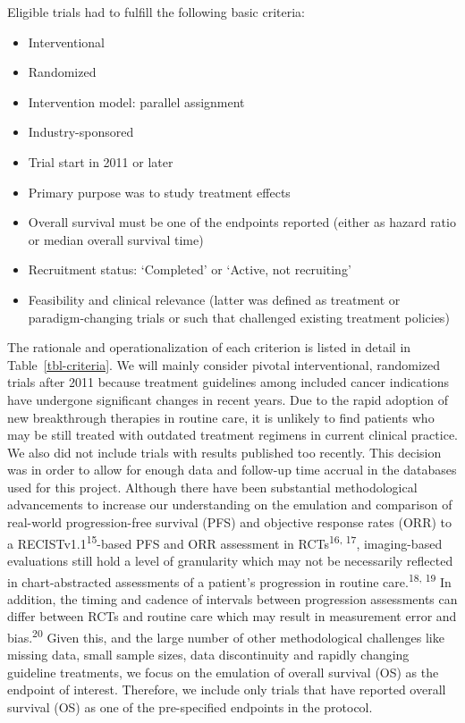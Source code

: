 \documentclass[
  letterpaper,
  DIV=11,
  numbers=noendperiod]{scrartcl}
\begin{document}
Eligible trials had to fulfill the following basic criteria:

\begin{itemize}
\item
  Interventional
\item
  Randomized
\item
  Intervention model: parallel assignment
\item
  Industry-sponsored
\item
  Trial start in 2011 or later
\item
  Primary purpose was to study treatment effects
\item
  Overall survival must be one of the endpoints reported (either as
  hazard ratio or median overall survival time)
\item
  Recruitment status: `Completed' or `Active, not recruiting'
\item
  Feasibility and clinical relevance (latter was defined as treatment or
  paradigm-changing trials or such that challenged existing treatment
  policies)
\end{itemize}

The rationale and operationalization of each criterion is listed in
detail in Table~\ref{tbl-criteria}. We will mainly consider pivotal
interventional, randomized trials after 2011 because treatment
guidelines among included cancer indications have undergone significant
changes in recent years. Due to the rapid adoption of new breakthrough
therapies in routine care, it is unlikely to find patients who may be
still treated with outdated treatment regimens in current clinical
practice. We also did not include trials with results published too
recently. This decision was in order to allow for enough data and
follow-up time accrual in the databases used for this project. Although
there have been substantial methodological advancements to increase our
understanding on the emulation and comparison of real-world
progression-free survival (PFS) and objective response rates (ORR) to a
RECISTv1.1\textsuperscript{15}-based PFS and ORR assessment in
RCTs\textsuperscript{16, 17}, imaging-based evaluations still hold a
level of granularity which may not be necessarily reflected in
chart-abstracted assessments of a patient's progression in routine
care.\textsuperscript{18, 19} In addition, the timing and cadence of
intervals between progression assessments can differ between RCTs and
routine care which may result in measurement error and
bias.\textsuperscript{20} Given this, and the large number of other
methodological challenges like missing data, small sample sizes, data
discontinuity and rapidly changing guideline treatments, we focus on the
emulation of overall survival (OS) as the endpoint of interest.
Therefore, we include only trials that have reported overall survival
(OS) as one of the pre-specified endpoints in the protocol.
\end{document}
